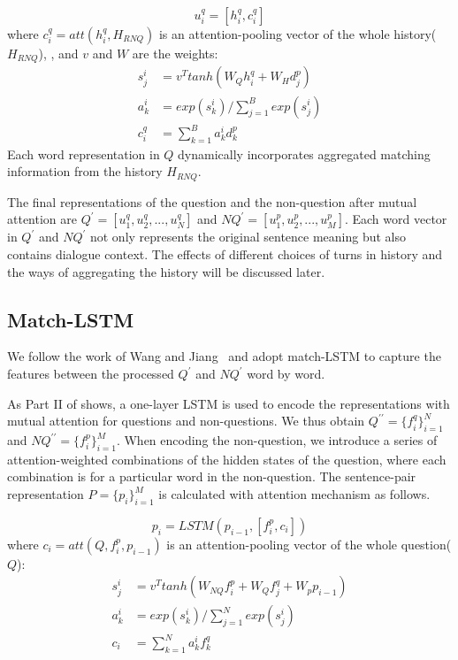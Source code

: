 \begin{equation}
u^q_i=[h^q_i,c^q_i]
\end{equation}
where $c^q_i=att(h^q_i,H_{RNQ})$ is an attention-pooling vector of the whole history($H_{RNQ}$),
, and $v$ and $W$ are the weights:
\begin{equation}
\begin{aligned}
s^i_j&=v^Ttanh(W_Qh^q_i+W_Hd^p_j)\\
a^i_k&=exp(s^i_k)/\sum_{j=1}^Bexp(s^i_j)\\
c^q_i&=\sum_{k=1}^Ba^i_kd^p_k
\end{aligned}
\end{equation}
Each word representation in $Q$ dynamically incorporates aggregated matching information from the history $H_{RNQ}$. 

The final representations of the question and the non-question after
mutual attention are $Q^\prime=[u^q_1,u^q_2,...,u^q_N]$ and 
$NQ^\prime=[u^p_1,u^p_2,...,u^p_M]$. Each word vector
in $Q^\prime$ and $NQ^\prime$ not only represents the original sentence meaning 
but also contains dialogue context. The effects of 
different choices of turns in history and the ways of aggregating the 
history will be discussed later.


\subsection{Match-LSTM}
We follow the work of Wang and Jiang~\cite{wang2016learning} 
and adopt match-LSTM to capture the features between the 
processed $Q^\prime$ and $NQ^\prime$ word by word.

As Part II of  shows,
a one-layer LSTM is used to encode the representations with mutual attention for 
questions and non-questions. 
We thus obtain $Q^{\prime\prime}=\{f^q_i\}_{i=1}^{N}$ and 
$NQ^{\prime\prime}=\{f^p_i\}_{i=1}^{M}$. 
When encoding the non-question, we introduce a series of attention-weighted 
combinations of the hidden states of the question, where each combination is for a particular word in the non-question. The sentence-pair representation $P=\{p_i\}_{i=1}^{M}$ is calculated with attention mechanism as follows. 

\begin{equation}
    p_i=LSTM(p_{i-1},[f^p_i,c_i])
\end{equation}
where $c_i=att(Q,f^p_i,p_{i-1})$ is an attention-pooling vector of the whole question($Q$):
\begin{equation}
\begin{aligned}
s^i_j&=v^Ttanh(W_{NQ}f^p_i+W_Qf^q_j+W_pp_{i-1})\\
a^i_k&=exp(s^i_k)/\sum_{j=1}^Nexp(s^i_j)\\
c_i&=\sum_{k=1}^Na^i_kf^q_k
\end{aligned}
\end{equation}

